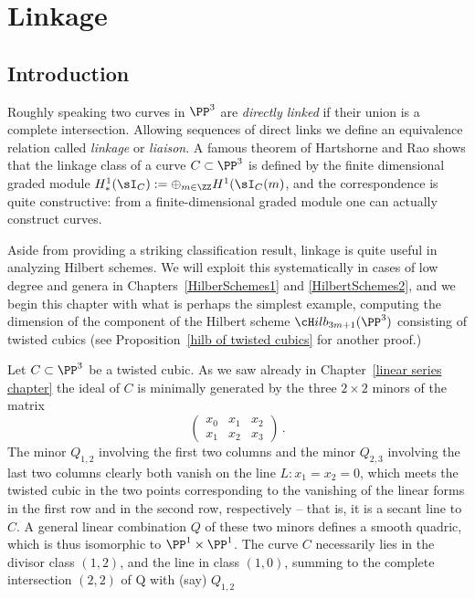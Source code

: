 

\chapter{Linkage}
\label{LiaisonChapter}\label{linkageChapter}


\section{Introduction} 

Roughly speaking two curves in $\PP^3$ are \emph{directly linked} if their union is a complete intersection.
Allowing sequences of direct links we define an equivalence relation called  \emph{linkage} or \emph{liaison}.
A famous theorem of Hartshorne and Rao shows that the linkage class of a curve $C\subset \PP^3$
is defined by the finite dimensional graded module $H^1_*(\sI_C) := \oplus_{m\in \ZZ}H^1(\sI_C(m)$,
and the correspondence is quite constructive: from a finite-dimensional graded module one can
actually construct curves.

Aside from providing a striking classification result, linkage is quite useful in analyzing Hilbert schemes. We will exploit this systematically in cases of low degree and genera in Chapters~\ref{HilberSchemes1} and \ref{HilbertSchemes2}, and we begin
this chapter with what is perhaps the simplest example, computing the dimension of the component of
the Hilbert scheme $\cH ilb_{3m+1}(\PP^3)$ consisting of twisted cubics (see Proposition~\ref{hilb of twisted cubics} for another proof.)

Let $C\subset \PP^3$ be a twisted cubic. As we saw already in Chapter~\ref{linear series chapter} the ideal of $C$
is minimally generated by the three $2\times 2$ minors of the matrix
$$
\begin{pmatrix}
 x_0&x_1&x_2\\
 x_1&x_2&x_3
\end{pmatrix}\,.
$$
The minor $Q_{1,2}$ involving the first two columns and the minor $Q_{2,3}$ involving the last two columns clearly
both vanish on the line $L: x_1 = x_2 = 0$, which meets the twisted cubic in the two points corresponding to the
vanishing of the linear forms in the first row and in the second row, respectively -- that is, it is a secant line to $C$. 
A general linear combination $Q$ of these two minors defines a smooth quadric, which is thus isomorphic to $\PP^1\times \PP^1$. The curve $C$ necessarily lies in the divisor class $(1,2)$, and the line in class $(1,0)$, summing to the 
complete intersection $(2,2)$ of Q with (say) $Q_{1,2}$

